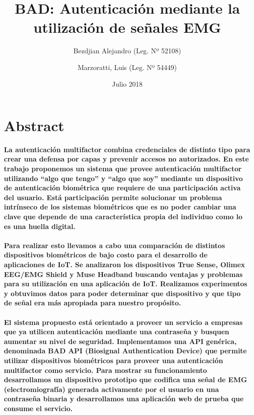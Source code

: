 \documentclass{article}
\title{BAD: Autenticación mediante la utilización de señales EMG}
\author{
    Bezdjian Alejandro (Leg. Nº 52108) \\
    \and
    Marzoratti, Luis (Leg. Nº 54449)
}
\date{Julio 2018}
\begin{document}
\maketitle
\thispagestyle{empty}
\clearpage
\tableofcontents
\clearpage

\section{Abstract}

\paragraph{
La autenticación multifactor combina credenciales de distinto tipo para crear una defensa por capas y prevenir accesos no autorizados. En este trabajo proponemos un sistema que provee autenticación multifactor utilizando ``algo que tengo'' y ``algo que soy'' mediante un dispositivo de autenticación biométrica que requiere de una participación activa del usuario. Está participación permite solucionar un problema intrínseco de los sistemas biométricos que es no poder cambiar una clave que depende de una característica propia del individuo como lo es una huella digital.
}
\paragraph{
Para realizar esto llevamos a cabo una comparación de distintos dispositivos biométricos de bajo costo para el desarrollo de aplicaciones de IoT. Se analizaron los dispositivos True Sense, Olimex EEG/EMG Shield y Muse Headband buscando ventajas y problemas para su utilización en una aplicación de IoT. Realizamos experimentos y obtuvimos datos para poder determinar que dispositivo y que tipo de señal era más apropiada para nuestro propósito.
}
\paragraph{
El sistema propuesto está orientado a proveer un servicio a empresas que ya utilicen autenticación mediante una contraseña y busquen aumentar su nivel de seguridad. Implementamos una API genérica, denominada BAD API (Biosignal Authentication Device) que permite utilizar dispositivos biométricos para proveer una autenticación multifactor como servicio. Para mostrar su funcionamiento desarrollamos un dispositivo prototipo que codifica una señal de EMG (electromiografía) generada activamente por el usuario en una contraseña binaria y desarrollamos una aplicación web de prueba que consume el servicio.
}
\end{document}
